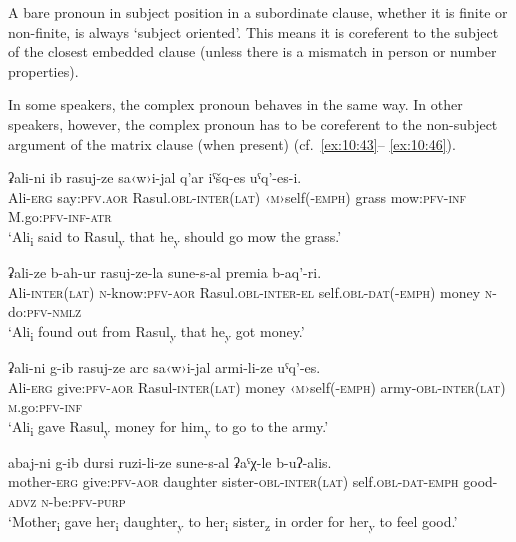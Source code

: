 ﻿\documentclass[output=paper]{langsci/langscibook}
\begin{document}

A bare pronoun in subject position in a subordinate clause, whether it
is finite or non-finite, is always `subject oriented'. This means it is
coreferent to the subject of the closest embedded clause (unless there
is a mismatch in person or number properties).

In some speakers, the complex pronoun behaves in the same way. In other
speakers, however, the complex pronoun has to be coreferent to the
non-subject argument of the matrix clause (when present) (cf.\ \ref{ex:10:43}–%
\ref{ex:10:46}).

\ea \label{ex:10:43} %
\gll  ʡali-ni ib rasuj-ze sa‹w›i-jal q'ar iˤšq-es uˤq'-es-i.\\
Ali-\textsc{erg} say:\textsc{pfv}.\textsc{aor} Rasul.\textsc{obl}-\textsc{inter}(\textsc{lat}) ‹\textsc{m}›self(-\textsc{emph}) grass mow:\textsc{pfv}-\textsc{inf} M.go:\textsc{pfv}-\textsc{inf}-\textsc{atr}\\
\glt `Ali\textsubscript{i} said to Rasul\textsubscript{y} that
he\textsubscript{y} should go mow the grass.'

\ex %
\gll  ʡali-ze b-ah-ur rasuj-ze-la sune-s-al premia b-aq'-ri.\\
Ali-\textsc{inter}(\textsc{lat}) \textsc{n}-know:\textsc{pfv}-\textsc{aor} Rasul.\textsc{obl}-\textsc{inter}-\textsc{el}  self.\textsc{obl}-\textsc{dat}(-\textsc{emph}) money \textsc{n}-do:\textsc{pfv}-\textsc{nmlz}\\ 
\glt `Ali\textsubscript{i} found out from Rasul\textsubscript{y} that
he\textsubscript{y} got money.'

\ex %
\gll  ʡali-ni g-ib rasuj-ze arc sa‹w›i-jal armi-li-ze uˤq'-es.\\
Ali-\textsc{erg} give:\textsc{pfv}-\textsc{aor} Rasul-\textsc{inter}(\textsc{lat}) money ‹\textsc{m}›self(-\textsc{emph}) army-\textsc{obl}-\textsc{inter}(\textsc{lat}) \textsc{m}.go:\textsc{pfv}-\textsc{inf}\\
\glt `Ali\textsubscript{i} gave Rasul\textsubscript{y} money for
him\textsubscript{y} to go to the army.'

\ex \label{ex:10:46} %
\gll  abaj-ni g-ib dursi ruzi-li-ze sune-s-al ʡaˤχ-le b-uʔ-alis.\\
mother-\textsc{erg} give:\textsc{pfv}-\textsc{aor} daughter sister-\textsc{obl}-\textsc{inter}(\textsc{lat}) self.\textsc{obl}-\textsc{dat}-\textsc{emph} good-\textsc{advz} \textsc{n}-be:\textsc{pfv}-\textsc{purp}\\ 
\glt `Mother\textsubscript{i} gave her\textsubscript{i}
daughter\textsubscript{y} to her\textsubscript{i}
sister\textsubscript{z} in order for her\textsubscript{y} to feel good.'
\z
\end{document}
